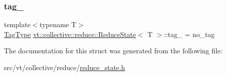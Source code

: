 \mbox{\label{structvt_1_1collective_1_1reduce_1_1_reduce_state_a100d0413795c97cfa7a6ef27e1644be7}} 
\subsubsection{\texorpdfstring{tag\+\_\+}{tag\_}}
{\footnotesize\ttfamily template$<$typename T$>$ \\
\hyperlink{namespacevt_a84ab281dae04a52a4b243d6bf62d0e52}{Tag\+Type} \hyperlink{structvt_1_1collective_1_1reduce_1_1_reduce_state}{vt\+::collective\+::reduce\+::\+Reduce\+State}$<$ T $>$\+::tag\+\_\+ = no\+\_\+tag}



The documentation for this struct was generated from the following file\+:\begin{DoxyCompactItemize}
\item 
src/vt/collective/reduce/\hyperlink{reduce__state_8h}{reduce\+\_\+state.\+h}\end{DoxyCompactItemize}
